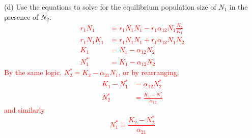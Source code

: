 \documentclass{article}
\begin{document}
(d) Use the equations to solve for the equilibrium population size of $N_1$ in the presence of $N_2$. 
\textcolor{red}{
\begin{align*}
	r_1 N_1 & = r_1 N_1 N_1 - r_1 \alpha_{12} N_1 \frac{N_2}{K_1}\\
	r_1 N_1 K_1 &= r_1 N_1 N_1 + r_1 \alpha_{12} N_1 N_2\\
	K_1 &= N_1 - \alpha_{12} N_2\\
	N_1^* &= K_1 - \alpha_{12} N_2
\end{align*}
By the same logic, 	$N_2^* = K_2 - \alpha_{21} N_1$, or by rearranging,
\begin{align*}
	K_1 - N_1^* &= \alpha_{12} N_2^*\\
	N_2^* &= \frac{K_1 - N_1^*}{\alpha_{12}}
\end{align*}
and similarly
\begin{equation*}
	N_1^* = \frac{K_2 - N_2^*}{\alpha_{21}}
\end{equation*}
}
\end{document}
